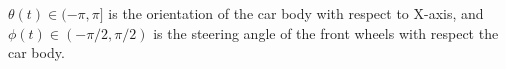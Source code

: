 \documentclass[
12pt,draftcls,onecolumn%
]{IEEEtran}
\begin{document}
$\theta(t)\in(-\pi,\pi]$ is the orientation of the car body with respect to X-axis, and $\phi(t)\in(-\pi/2,\pi/2)$ is the steering angle of the front wheels with respect the car body.
\end{document}
